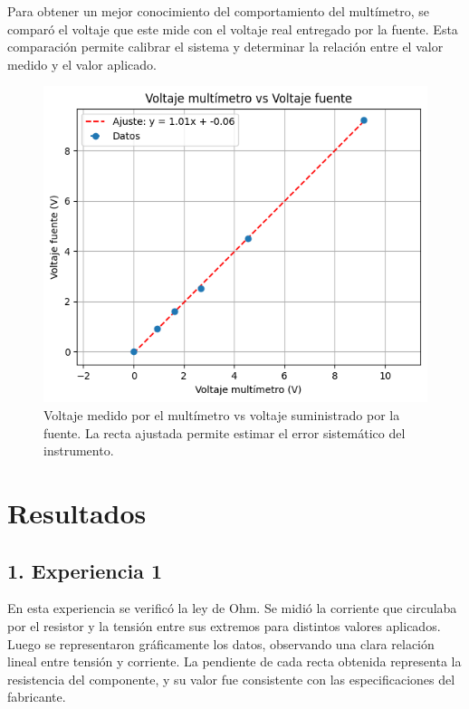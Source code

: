 \documentclass[11pt]{article}
\begin{document}
Para obtener un mejor conocimiento del comportamiento del multímetro, se comparó el voltaje que este mide con el voltaje real entregado por la fuente. Esta comparación permite calibrar el sistema y determinar la relación entre el valor medido y el valor aplicado.

\begin{figure}[H]
    \centering
    \includegraphics[width=.9\linewidth]{VvsV.png}
    \caption{Voltaje medido por el multímetro vs voltaje suministrado por la fuente. La recta ajustada permite estimar el error sistemático del instrumento.}
    \label{fig:vvsf}
\end{figure}

\section*{Resultados}

\subsection*{1. Experiencia 1}

En esta experiencia se verificó la ley de Ohm. Se midió la corriente que circulaba por el resistor y la tensión entre sus extremos para distintos valores aplicados. Luego se representaron gráficamente los datos, observando una clara relación lineal entre tensión y corriente. La pendiente de cada recta obtenida representa la resistencia del componente, y su valor fue consistente con las especificaciones del fabricante.
\end{document}
